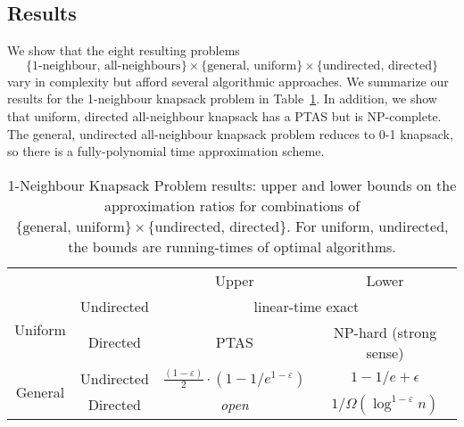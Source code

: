 \documentclass[12pt]{article}
\begin{document}
\subsection{Results}

We show that the eight resulting problems
\[
\{\mbox{1-neighbour, all-neighbours}\} \times \{\mbox{general, uniform}\}\times\{\mbox{undirected, directed}\}
\]
vary in complexity but afford several algorithmic approaches.  We
summarize our results for the 1-neighbour knapsack problem in Table~\ref{tbl:results}.  In addition, we show that uniform, directed
all-neighbour knapsack has a PTAS but is NP-complete.  The general,
undirected all-neighbour knapsack problem reduces to 0-1 knapsack, so there is a fully-polynomial time approximation scheme.











\begin{table}[tb]
\begin{center}
\begin{tabular}{cccc}
\toprule

&  & Upper & Lower \\
\cmidrule(r){2-4}
\multirow{2}{*}{\hspace{3mm}Uniform\hspace{3mm}} & \hspace{3mm}Undirected\hspace{3mm} & \multicolumn{2}{c}{linear-time exact}  \\
\cmidrule(r){2-4}
& Directed & PTAS & \hspace{3mm}NP-hard (strong sense) \hspace{3mm} \\
\cmidrule(r){2-4}
\multirow{2}{*}{General} & Undirected & \hspace{3mm}$\frac{(1-\varepsilon)}{2} \cdot (1-1/e^{1-\varepsilon})$\hspace{3mm} &   $1-1/e+\epsilon$ \\
\cmidrule(r){2-4}
& Directed & {\em open} & $1/ \Omega(\log^{1-\varepsilon} n)$ \\
\bottomrule
\end{tabular}
\end{center}
\caption{\label{tbl:results} 1-Neighbour Knapsack Problem results:  upper and lower bounds on the approximation ratios for combinations of $\{\mbox{general, uniform}\} \times \{\mbox{undirected, directed}\}$.  For uniform, undirected, the bounds are running-times of optimal algorithms.}


\end{table}
\end{document}
